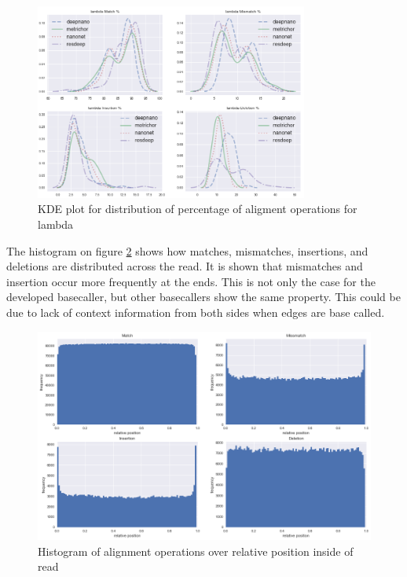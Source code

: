 \documentclass[times, utf8, diplomski, numeric, english]{fer}
\begin{document}
\begin{figure}[!htb]
	\begin{center}
		\includegraphics[width=0.8\textwidth]{./imgs/results/lambda/kde_cigar_lines.png}
		\caption{KDE plot for distribution of percentage of aligment operations for lambda}
		\label{fg:lambda_kde}
	\end{center}
\end{figure}
\FloatBarrier

The histogram on figure \ref{fg:cigar_op_dist} shows how matches, mismatches, insertions, and deletions are distributed across the read. It is shown that mismatches and insertion occur more frequently at the ends. This is not only the case for the developed basecaller, but other basecallers show the same property. This could be due to lack of context information from both sides when edges are base called.

\begin{figure}[!ht]
	\begin{center}
		\includegraphics[width=1\textwidth]{./imgs/operation_distributed_r9.png}
		\caption{Histogram of alignment operations over relative position inside of read}
		\label{fg:cigar_op_dist}
	\end{center}
\end{figure}
\end{document}

